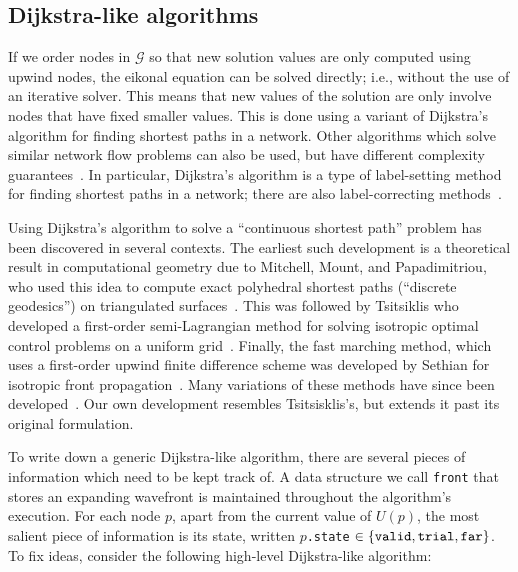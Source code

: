 \documentclass{article}
\begin{document}
\subsection{Dijkstra-like algorithms}\label{ssec:dijkstra-like}
If we order nodes in $\mathcal{G}$ so that new solution values are
only computed using upwind nodes, the eikonal equation can be solved
directly; i.e., without the use of an iterative solver. This means
that new values of the solution are only involve nodes that have fixed
smaller values. This is done using a variant of Dijkstra's algorithm
for finding shortest paths in a network. Other algorithms which solve
similar network flow problems can also be used, but have different
complexity guarantees~\cite{chacon2012fast}. In particular, Dijkstra's
algorithm is a type of label-setting method for finding shortest paths
in a network; there are also label-correcting
methods~\cite{bertsekas1998network}.

Using Dijkstra's algorithm to solve a ``continuous shortest path''
problem has been discovered in several contexts. The earliest such
development is a theoretical result in computational geometry due to
Mitchell, Mount, and Papadimitriou, who used this idea to compute
exact polyhedral shortest paths (``discrete geodesics'') on
triangulated surfaces~\cite{mitchell1987discrete}. This was followed
by Tsitsiklis who developed a first-order semi-Lagrangian method for
solving isotropic optimal control problems on a uniform
grid~\cite{tsitsiklis1995efficient}. Finally, the fast marching
method, which uses a first-order upwind finite difference scheme was
developed by Sethian for isotropic front
propagation~\cite{sethian1996fast}. Many variations of these methods
have since been
developed~\cite{sethian2003ordered,kao2008legendre}. Our own
development resembles Tsitsisklis's, but extends it past its original
formulation.

To write down a generic Dijkstra-like algorithm, there are several
pieces of information which need to be kept track of. A data structure
we call \texttt{front} that stores an expanding wavefront is
maintained throughout the algorithm's execution. For each node $p$,
apart from the current value of $U(p)$, the most salient piece of
information is its state, written $p$\texttt{.state}
$\in \left\{\texttt{valid}, \texttt{trial}, \texttt{far}\right\}$. To fix
ideas, consider the following high-level Dijkstra-like algorithm:
\end{document}
